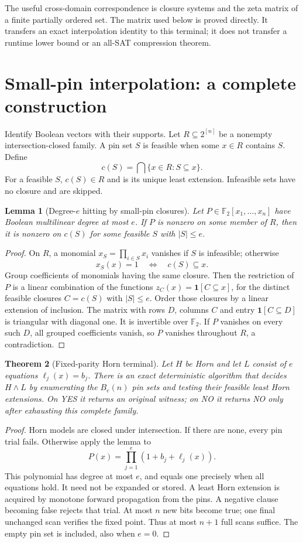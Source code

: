 \documentclass[11pt]{article}
\newtheorem{theorem}{Theorem}
\newtheorem{lemma}[theorem]{Lemma}
\newcommand{\F}{\mathbb F_2}
\begin{document}
The useful cross-domain correspondence is closure systems and the zeta
matrix of a finite partially ordered set. The matrix used below is proved
directly. It transfers an exact interpolation identity to this terminal;
it does not transfer a runtime lower bound or an all-SAT compression theorem.

\section{Small-pin interpolation: a complete construction}
Identify Boolean vectors with their supports. Let $R\subseteq 2^{[n]}$ be
a nonempty intersection-closed family. A pin set $S$ is feasible when some
$x\in R$ contains $S$. Define
\[
 c(S)=\bigcap\{x\in R:S\subseteq x\}.
\]
For a feasible $S$, $c(S)\in R$ and is its unique least extension.
Infeasible sets have no closure and are skipped.

\begin{lemma}[Degree-$e$ hitting by small-pin closures]
Let $P\in\F[x_1,\ldots,x_n]$ have Boolean multilinear degree at most $e$.
If $P$ is nonzero on some member of $R$, then it is nonzero on $c(S)$ for
some feasible $S$ with $|S|\le e$.
\end{lemma}
\begin{proof}
On $R$, a monomial $x_S=\prod_{i\in S}x_i$ vanishes if $S$ is infeasible;
otherwise
\[
 x_S(x)=1\quad\Longleftrightarrow\quad c(S)\subseteq x.
\]
Group coefficients of monomials having the same closure. Then the
restriction of $P$ is a linear combination of the functions
$z_C(x)=\mathbf1[C\subseteq x]$, for the distinct feasible closures
$C=c(S)$ with $|S|\le e$. Order those closures by a linear extension of
inclusion. The matrix with rows $D$, columns $C$ and entry
$\mathbf1[C\subseteq D]$ is triangular with diagonal one. It is invertible
over $\F$. If $P$ vanishes on every such $D$, all grouped coefficients
vanish, so $P$ vanishes throughout $R$, a contradiction.
\end{proof}

\begin{theorem}[Fixed-parity Horn terminal]
Let $H$ be Horn and let $L$ consist of $e$ equations
$\ell_j(x)=b_j$. There is an exact deterministic algorithm that decides
$H\land L$ by enumerating the $B_e(n)$ pin sets and testing their feasible
least Horn extensions. On YES it returns an original witness; on NO it
returns NO only after exhausting this complete family.
\end{theorem}
\begin{proof}
Horn models are closed under intersection. If there are none, every pin
trial fails. Otherwise apply the lemma to
\[
 P(x)=\prod_{j=1}^{e}(1+b_j+\ell_j(x)).
\]
This polynomial has degree at most $e$, and equals one precisely when all
equations hold. It need not be expanded or stored. A least Horn extension
is acquired by monotone forward propagation from the pins. A negative
clause becoming false rejects that trial. At most $n$ new bits become true;
one final unchanged scan verifies the fixed point. Thus at most $n+1$
full scans suffice. The empty pin set is included, also when $e=0$.
\end{proof}
\end{document}
